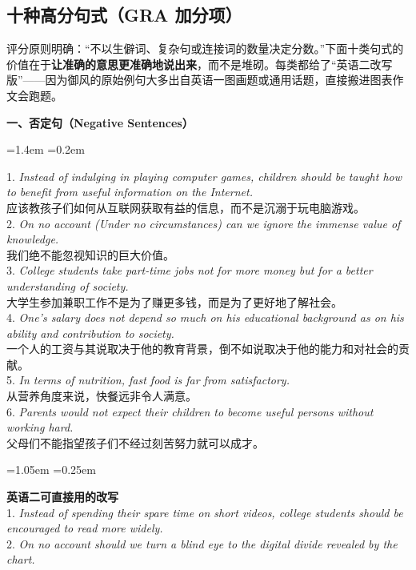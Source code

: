 \documentclass[11pt,a4paper]{ctexart}
\newcommand{\en}[1]{\textit{#1}}
\newcommand{\rubric}[1]{\par\addvspace{3pt}\noindent{\bfseries【对标评分】}#1\par\addvspace{3pt}}
\newenvironment{note}{%
  \par\addvspace{5pt}%
  \begin{list}{}{\leftmargin=1.05em \rightmargin=0.25em \listparindent=0pt
    \itemindent=0pt \topsep=0pt \parsep=2pt \itemsep=2pt \partopsep=0pt}%
  \item\relax\small\color{ink}%
}{%
  \end{list}\addvspace{5pt}%
}
\newenvironment{eg}{%
  \par\addvspace{4pt}%
  \begin{list}{}{\leftmargin=1.4em \rightmargin=0.2em \listparindent=0pt
    \itemindent=0pt \topsep=0pt \parsep=2pt \itemsep=2pt \partopsep=0pt}%
  \item\relax
}{%
  \end{list}\addvspace{5pt}%
}
\begin{document}
\subsection{十种高分句式（GRA 加分项）}

\rubric{评分原则明确：“不以生僻词、复杂句或连接词的数量决定分数。”下面十类句式的价值在于\textbf{让准确的意思更准确地说出来}，而不是堆砌。每类都给了“英语二改写版”——因为御风的原始例句大多出自英语一图画题或通用话题，直接搬进图表作文会跑题。}

\par\addvspace{6pt}\noindent\textbf{一、否定句（Negative Sentences）}\par\addvspace{2pt}
\begin{eg}
1. \en{Instead of indulging in playing computer games, children should be taught how to benefit from useful information on the Internet.}\\
应该教孩子们如何从互联网获取有益的信息，而不是沉溺于玩电脑游戏。\\
2. \en{On no account (Under no circumstances) can we ignore the immense value of knowledge.}\\
我们绝不能忽视知识的巨大价值。\\
3. \en{College students take part-time jobs not for more money but for a better understanding of society.}\\
大学生参加兼职工作不是为了赚更多钱，而是为了更好地了解社会。\\
4. \en{One's salary does not depend so much on his educational background as on his ability and contribution to society.}\\
一个人的工资与其说取决于他的教育背景，倒不如说取决于他的能力和对社会的贡献。\\
5. \en{In terms of nutrition, fast food is far from satisfactory.}\\
从营养角度来说，快餐远非令人满意。\\
6. \en{Parents would not expect their children to become useful persons without working hard.}\\
父母们不能指望孩子们不经过刻苦努力就可以成才。\\
\end{eg}
\begin{note}
\textbf{英语二可直接用的改写}\\
1. \en{Instead of spending their spare time on short videos, college students should be encouraged to read more widely.}\\
2. \en{On no account should we turn a blind eye to the digital divide revealed by the chart.}
\end{note}
\end{document}
